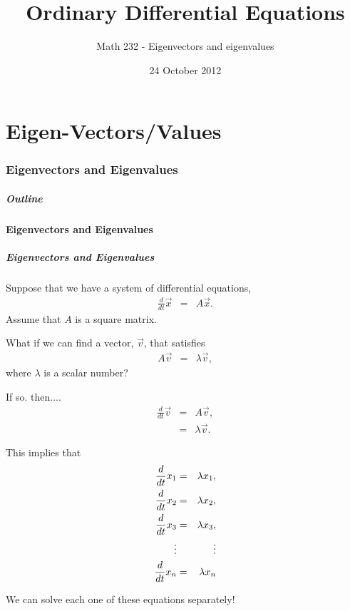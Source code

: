 \part{Eigen-Vectors/Values}
\section{Eigenvectors and Eigenvalues}


\title{Ordinary Differential Equations}
\subtitle{Math 232 - Eigenvectors and eigenvalues}
\date{24 October 2012}

\begin{frame}
  \titlepage
\end{frame}

\begin{frame}
  \frametitle{Outline}
\end{frame}


\subsection{Eigenvectors and Eigenvalues}


\begin{frame}
  \frametitle{Eigenvectors and Eigenvalues}

  Suppose that we have a system of differential equations,
  \begin{eqnarray*}
    \frac{d}{dt} \vec{x} & = & A \vec{x}.
  \end{eqnarray*}
  Assume that $A$ is a square matrix.

  What if we can find a vector, $\vec{v}$, that satisfies
  \begin{eqnarray*}
    A \vec{v} & = & \lambda \vec{v},
  \end{eqnarray*}
  where $\lambda$ is a scalar number?

\end{frame}


\begin{frame}
  If so. then....
  \begin{eqnarray*}
    \frac{d}{dt} \vec{v} & = & A \vec{v}, \\
    & = & \lambda \vec{v}.
  \end{eqnarray*}
  
  This implies that
  \begin{eqnarray*}
    \deriv{x_1}{t} & = & \lambda x_1, \\
    \deriv{x_2}{t} & = & \lambda x_2, \\
    \deriv{x_3}{t} & = & \lambda x_3, \\
    \vdots         &   & \vdots \\
    \deriv{x_n}{t} & = & \lambda x_n
  \end{eqnarray*}

  We can solve each one of these equations separately!

\end{frame}


